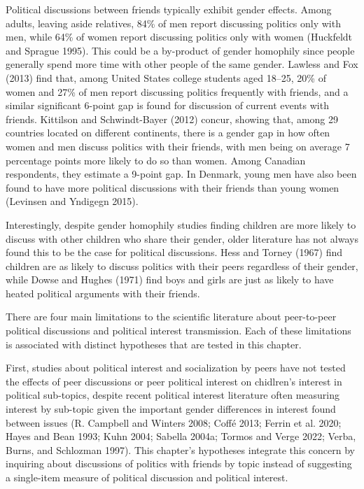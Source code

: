 \documentclass[
  letterpaper,
  DIV=11,
  numbers=noendperiod]{scrreprt}
\begin{document}
Political discussions between friends typically exhibit gender effects.
Among adults, leaving aside relatives, 84\% of men report discussing
politics only with men, while 64\% of women report discussing politics
only with women (Huckfeldt and Sprague 1995). This could be a by-product
of gender homophily since people generally spend more time with other
people of the same gender. Lawless and Fox (2013) find that, among
United States college students aged 18--25, 20\% of women and 27\% of
men report discussing politics frequently with friends, and a similar
significant 6-point gap is found for discussion of current events with
friends. Kittilson and Schwindt-Bayer (2012) concur, showing that, among
29 countries located on different continents, there is a gender gap in
how often women and men discuss politics with their friends, with men
being on average 7 percentage points more likely to do so than women.
Among Canadian respondents, they estimate a 9-point gap. In Denmark,
young men have also been found to have more political discussions with
their friends than young women (Levinsen and Yndigegn 2015).

Interestingly, despite gender homophily studies finding children are
more likely to discuss with other children who share their gender, older
literature has not always found this to be the case for political
discussions. Hess and Torney (1967) find children are as likely to
discuss politics with their peers regardless of their gender, while
Dowse and Hughes (1971) find boys and girls are just as likely to have
heated political arguments with their friends.

There are four main limitations to the scientific literature about
peer-to-peer political discussions and political interest transmission.
Each of these limitations is associated with distinct hypotheses that
are tested in this chapter.

First, studies about political interest and socialization by peers have
not tested the effects of peer discussions or peer political interest on
chidlren's interest in political sub-topics, despite recent political
interest literature often measuring interest by sub-topic given the
important gender differences in interest found between issues (R.
Campbell and Winters 2008; Coffé 2013; Ferrin et al. 2020; Hayes and
Bean 1993; Kuhn 2004; Sabella 2004a; Tormos and Verge 2022; Verba,
Burns, and Schlozman 1997). This chapter's hypotheses integrate this
concern by inquiring about discussions of politics with friends by topic
instead of suggesting a single-item measure of political discussion and
political interest.
\end{document}
